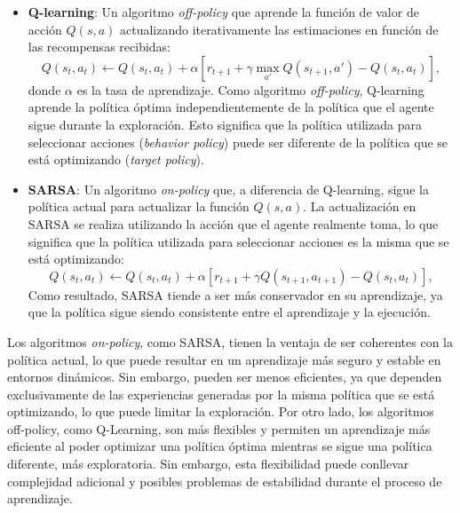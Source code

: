 \documentclass[a4paper,12pt, twoside]{report}
\begin{document}
\begin{itemize}
    \item \textbf{Q-learning}: Un algoritmo \textit{off-policy} que aprende la función de valor de 
    acción \(Q(s, a)\) actualizando iterativamente las estimaciones en función de las recompensas recibidas:
    \begin{equation}
    Q(s_t, a_t) \leftarrow Q(s_t, a_t) + \alpha \left[r_{t+1} + \gamma \max_{a'} Q(s_{t+1}, a') - Q(s_t, a_t)\right],
    \end{equation}
    donde \(\alpha\) es la tasa de aprendizaje. Como algoritmo \textit{off-policy}, Q-learning aprende la 
    política óptima independientemente de la política que el agente sigue durante la exploración. 
    Esto significa que la política utilizada para seleccionar acciones (\textit{behavior policy}) 
    puede ser diferente de la política que se está optimizando (\textit{target policy}).

    \item \textbf{SARSA}: Un algoritmo \textit{on-policy} que, a diferencia de Q-learning, sigue la 
    política actual para actualizar la función \(Q(s, a)\). La actualización en SARSA se realiza 
    utilizando la acción que el agente realmente toma, lo que significa que la política utilizada 
    para seleccionar acciones es la misma que se está optimizando:
    \begin{equation}
    Q(s_t, a_t) \leftarrow Q(s_t, a_t) + \alpha \left[r_{t+1} + \gamma Q(s_{t+1}, a_{t+1}) - Q(s_t, a_t)\right],
    \end{equation}
    Como resultado, SARSA tiende a ser más conservador en su aprendizaje, ya que la política sigue 
    siendo consistente entre el aprendizaje y la ejecución.

\end{itemize}


Los algoritmos \textit{on-policy}, como SARSA, tienen la ventaja de ser coherentes con la política 
actual, lo que puede resultar en un aprendizaje más seguro y estable en entornos dinámicos. Sin embargo, 
pueden ser menos eficientes, ya que dependen exclusivamente de las experiencias generadas por la misma 
política que se está optimizando, lo que puede limitar la exploración. Por otro lado, los algoritmos 
off-policy, como Q-Learning, son más flexibles y permiten un aprendizaje más eficiente al poder optimizar 
una política óptima mientras se sigue una política diferente, más exploratoria. Sin embargo, esta 
flexibilidad puede conllevar complejidad adicional y posibles problemas de estabilidad durante el 
proceso de aprendizaje.
\end{document}
